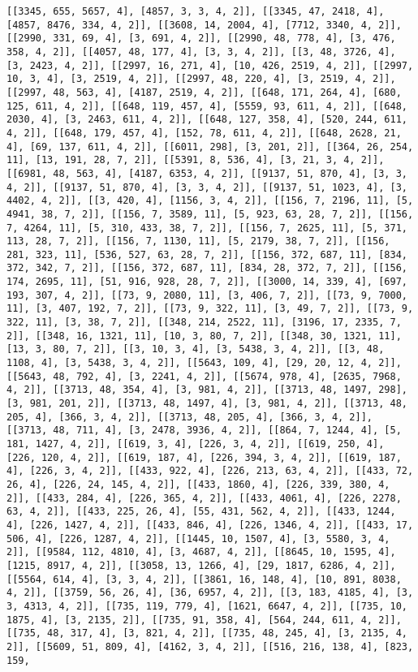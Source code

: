 \documentclass[12pt,fleqn]{article}\usepackage{../../common}
\begin{document}
\begin{verbatim}
[[3345, 655, 5657, 4], [4857, 3, 3, 4, 2]], [[3345, 47, 2418, 4], [4857, 8476, 334, 4, 2]], [[3608, 14, 2004, 4], [7712, 3340, 4, 2]], [[2990, 331, 69, 4], [3, 691, 4, 2]], [[2990, 48, 778, 4], [3, 476, 358, 4, 2]], [[4057, 48, 177, 4], [3, 3, 4, 2]], [[3, 48, 3726, 4], [3, 2423, 4, 2]], [[2997, 16, 271, 4], [10, 426, 2519, 4, 2]], [[2997, 10, 3, 4], [3, 2519, 4, 2]], [[2997, 48, 220, 4], [3, 2519, 4, 2]], [[2997, 48, 563, 4], [4187, 2519, 4, 2]], [[648, 171, 264, 4], [680, 125, 611, 4, 2]], [[648, 119, 457, 4], [5559, 93, 611, 4, 2]], [[648, 2030, 4], [3, 2463, 611, 4, 2]], [[648, 127, 358, 4], [520, 244, 611, 4, 2]], [[648, 179, 457, 4], [152, 78, 611, 4, 2]], [[648, 2628, 21, 4], [69, 137, 611, 4, 2]], [[6011, 298], [3, 201, 2]], [[364, 26, 254, 11], [13, 191, 28, 7, 2]], [[5391, 8, 536, 4], [3, 21, 3, 4, 2]], [[6981, 48, 563, 4], [4187, 6353, 4, 2]], [[9137, 51, 870, 4], [3, 3, 4, 2]], [[9137, 51, 870, 4], [3, 3, 4, 2]], [[9137, 51, 1023, 4], [3, 4402, 4, 2]], [[3, 420, 4], [1156, 3, 4, 2]], [[156, 7, 2196, 11], [5, 4941, 38, 7, 2]], [[156, 7, 3589, 11], [5, 923, 63, 28, 7, 2]], [[156, 7, 4264, 11], [5, 310, 433, 38, 7, 2]], [[156, 7, 2625, 11], [5, 371, 113, 28, 7, 2]], [[156, 7, 1130, 11], [5, 2179, 38, 7, 2]], [[156, 281, 323, 11], [536, 527, 63, 28, 7, 2]], [[156, 372, 687, 11], [834, 372, 342, 7, 2]], [[156, 372, 687, 11], [834, 28, 372, 7, 2]], [[156, 174, 2695, 11], [51, 916, 928, 28, 7, 2]], [[3000, 14, 339, 4], [697, 193, 307, 4, 2]], [[73, 9, 2080, 11], [3, 406, 7, 2]], [[73, 9, 7000, 11], [3, 407, 192, 7, 2]], [[73, 9, 322, 11], [3, 49, 7, 2]], [[73, 9, 322, 11], [3, 38, 7, 2]], [[348, 214, 2522, 11], [3196, 17, 2335, 7, 2]], [[348, 16, 1321, 11], [10, 3, 80, 7, 2]], [[348, 30, 1321, 11], [13, 3, 80, 7, 2]], [[3, 10, 3, 4], [3, 5438, 3, 4, 2]], [[3, 48, 1108, 4], [3, 5438, 3, 4, 2]], [[5643, 109, 4], [29, 20, 12, 4, 2]], [[5643, 48, 792, 4], [3, 2241, 4, 2]], [[5674, 978, 4], [2635, 7968, 4, 2]], [[3713, 48, 354, 4], [3, 981, 4, 2]], [[3713, 48, 1497, 298], [3, 981, 201, 2]], [[3713, 48, 1497, 4], [3, 981, 4, 2]], [[3713, 48, 205, 4], [366, 3, 4, 2]], [[3713, 48, 205, 4], [366, 3, 4, 2]], [[3713, 48, 711, 4], [3, 2478, 3936, 4, 2]], [[864, 7, 1244, 4], [5, 181, 1427, 4, 2]], [[619, 3, 4], [226, 3, 4, 2]], [[619, 250, 4], [226, 120, 4, 2]], [[619, 187, 4], [226, 394, 3, 4, 2]], [[619, 187, 4], [226, 3, 4, 2]], [[433, 922, 4], [226, 213, 63, 4, 2]], [[433, 72, 26, 4], [226, 24, 145, 4, 2]], [[433, 1860, 4], [226, 339, 380, 4, 2]], [[433, 284, 4], [226, 365, 4, 2]], [[433, 4061, 4], [226, 2278, 63, 4, 2]], [[433, 225, 26, 4], [55, 431, 562, 4, 2]], [[433, 1244, 4], [226, 1427, 4, 2]], [[433, 846, 4], [226, 1346, 4, 2]], [[433, 17, 506, 4], [226, 1287, 4, 2]], [[1445, 10, 1507, 4], [3, 5580, 3, 4, 2]], [[9584, 112, 4810, 4], [3, 4687, 4, 2]], [[8645, 10, 1595, 4], [1215, 8917, 4, 2]], [[3058, 13, 1266, 4], [29, 1817, 6286, 4, 2]], [[5564, 614, 4], [3, 3, 4, 2]], [[3861, 16, 148, 4], [10, 891, 8038, 4, 2]], [[3759, 56, 26, 4], [36, 6957, 4, 2]], [[3, 183, 4185, 4], [3, 3, 4313, 4, 2]], [[735, 119, 779, 4], [1621, 6647, 4, 2]], [[735, 10, 1875, 4], [3, 2135, 2]], [[735, 91, 358, 4], [564, 244, 611, 4, 2]], [[735, 48, 317, 4], [3, 821, 4, 2]], [[735, 48, 245, 4], [3, 2135, 4, 2]], [[5609, 51, 809, 4], [4162, 3, 4, 2]], [[516, 216, 138, 4], [823, 159, 
\end{verbatim}
\end{document}
